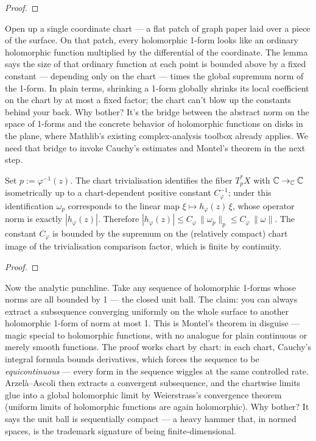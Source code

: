 \begin{proof}\leanok\end{proof}

\begin{layman}
Open up a single coordinate chart --- a flat patch of graph paper laid over
a piece of the surface. On that patch, every holomorphic 1-form looks
like an ordinary holomorphic function multiplied by the differential of
the coordinate. The lemma says the size of that ordinary function at
each point is bounded above by a fixed constant --- depending only on the
chart --- times the global supremum norm of the 1-form. In plain terms,
shrinking a 1-form globally shrinks its local coefficient on the chart
by at most a fixed factor; the chart can't blow up the constants behind
your back. Why bother? It's the bridge between the abstract norm on the
space of 1-forms and the concrete behavior of holomorphic functions on
disks in the plane, where Mathlib's existing complex-analysis toolbox
already applies. We need that bridge to invoke Cauchy's estimates and
Montel's theorem in the next step.
\end{layman}

\begin{proofsketch}
Set \(p := \varphi^{-1}(z)\). The chart trivialisation identifies the
fiber \(T^{*}_{p}X\) with \(\mathbb{C} \to_{\mathbb{C}} \mathbb{C}\) isometrically up to a
chart-dependent positive constant \(C_{\varphi}^{-1}\); under this
identification \(\omega_{p}\) corresponds to the linear map
\(\xi\mapsto h_{\varphi}(z)\,\xi\), whose operator norm is exactly
\(|h_{\varphi}(z)|\). Therefore
\(|h_{\varphi}(z)| \le C_{\varphi}\,\|\omega_{p}\|_{p} \le
C_{\varphi}\,\|\omega\|\). The constant \(C_{\varphi}\) is bounded by
the supremum on the (relatively compact) chart image of the
trivialisation comparison factor, which is finite by continuity.
\end{proofsketch}


\begin{proof}\leanok\end{proof}

\begin{layman}
Now the analytic punchline. Take any sequence of holomorphic 1-forms
whose norms are all bounded by 1 --- the closed unit ball. The claim: you
can always extract a subsequence converging uniformly on the whole
surface to another holomorphic 1-form of norm at most 1. This is Montel's
theorem in disguise --- magic special to holomorphic functions, with no
analogue for plain continuous or merely smooth functions. The proof works
chart by chart: in each chart, Cauchy's integral formula bounds
derivatives, which forces the sequence to be \emph{equicontinuous} --- every
form in the sequence wiggles at the same controlled rate. Arzel\`a--Ascoli
then extracts a convergent subsequence, and the chartwise limits glue
into a global holomorphic limit by Weierstrass's convergence theorem
(uniform limits of holomorphic functions are again holomorphic). Why
bother? It says the unit ball is sequentially compact --- a heavy hammer
that, in normed spaces, is the trademark signature of being
finite-dimensional.
\end{layman}

